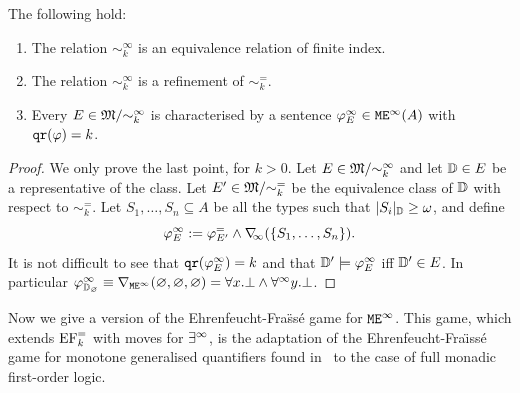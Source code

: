 \begin{proposition}\label{props:eqrelolque} The following hold:
\begin{enumerate}
 pt
\item 
The relation $\sim^\infty_k$ is an equivalence relation of finite index.
\item 
The relation $\sim^\infty_k$ is a refinement of $\sim^=_k$.
\item 
Every $E \in \mathfrak{M}/{\sim^\infty_k}$ is characterised by a sentence
   $\varphi^\infty_E \in \mathtt{M}\mathtt{E}^{\infty}(A)$ with $\mathtt{qr}(\varphi) = k$.
	\end{enumerate}
\end{proposition}

\begin{proof}
We only prove the last point, for $k>0$. 
Let $E \in \mathfrak{M}/{\sim^\infty_k}$ and let $\mathbb{D} \in E$ be a representative 
of the class. 
Let $E' \in \mathfrak{M}/{\sim^=_k}$ be the equivalence class of $\mathbb{D}$ with 
respect to $\sim^=_k$.
Let $S_1,\dots,S_n \subseteq A$ be all the types such that $|S_i|_{\mathbb{D}} \geq 
\omega$, and define
\[
\varphi^\infty_E \mathrel{:=}  \varphi^=_{E'} \land \nabla_{\!\!\infty}(\{S_1,\dots,S_n\}) .
\]
It is not difficult to see that $\mathtt{qr}(\varphi^\infty_E) = k$ and that $\mathbb{D}'
\models \varphi^\infty_E$ iff $\mathbb{D}' \in E$.  
In particular $\varphi^\infty_{\mathbb{D}_\varnothing} \equiv \nabla_{\mathtt{M}\mathtt{E}^{\infty}}(\varnothing,\varnothing,\varnothing) =
\forall x. \bot \land \forall^\infty y. \bot$.
\end{proof}

Now we give a version of the Ehrenfeucht-Fra\"ss\'e game for $\mathtt{M}\mathtt{E}^{\infty}$. 
This game, which extends $\mathrm{EF}^=_k$ with moves for $\exists^\infty$, is the
adaptation of the Ehrenfeucht-Fra\"{\i}ss\'e game for monotone generalised 
quantifiers found in~\cite{krawczyk1976ehrenfeucht} to the case of full monadic 
first-order logic. 

